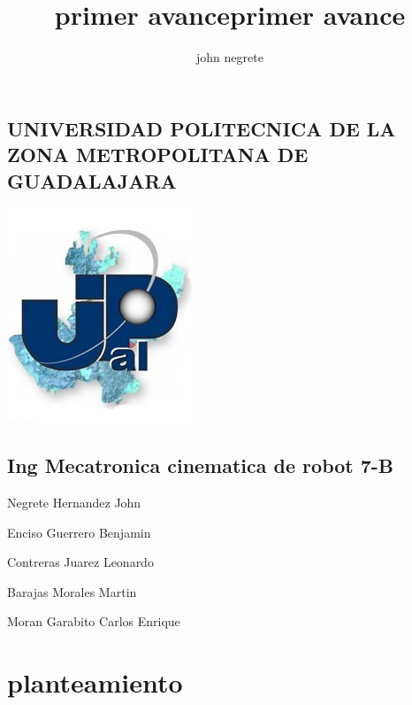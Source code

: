 \documentclass[12pt,letterpaper]{article}
\author{john negrete}
\title {primer avance}
\begin{document}
 

\title {primer avance}
\begin{center}
\section*{ 	UNIVERSIDAD POLITECNICA DE LA ZONA METROPOLITANA DE GUADALAJARA }
\end{center}
\begin{center}
\includegraphics[scale=1.3]{upz.jpg}
\end{center}
\begin{center}
\section*{Ing Mecatronica cinematica de robot 7-B}
\end{center}

\begin{center}
Negrete Hernandez John
\end{center}

\begin{center}
Enciso Guerrero Benjamin
\end{center}

\begin{center}
Contreras Juarez Leonardo
\end{center}

\begin{center}
Barajas Morales Martin
\end{center}

\begin{center}
Moran Garabito Carlos Enrique
\end{center}

\newpage 
\section*{planteamiento}
\end{document}
